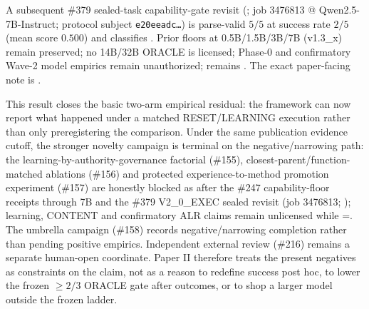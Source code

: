\begin{sloppypar}
A subsequent \#379 sealed-task capability-gate revisit (; job 3476813 @ Qwen2.5-7B-Instruct; protocol subject \texttt{e20eeadc\ldots}) is parse-valid $5/5$ at success rate $2/5$ (mean score $0.500$) and classifies .  Prior floors at 0.5B/1.5B/3B/7B (v1.3\_x) remain preserved; no 14B/32B ORACLE is licensed; Phase-0 and confirmatory Wave-2 model empirics remain unauthorized;  remains .  The exact paper-facing note is
.
\end{sloppypar}


This result closes the basic two-arm empirical residual: the framework can now report what happened under a matched RESET/LEARNING execution rather than only preregistering the comparison.  Under the same publication evidence cutoff, the stronger novelty campaign is terminal on the negative/narrowing path: the learning-by-authority-governance factorial (\#155), closest-parent/function-matched ablations (\#156) and protected experience-to-method promotion experiment (\#157) are honestly blocked as  after the \#247 capability-floor receipts through 7B and the \#379 V2\_0\_EXEC sealed revisit (job 3476813; ); learning, CONTENT and confirmatory ALR claims remain unlicensed while =.  The umbrella campaign (\#158) records negative/narrowing completion rather than pending positive empirics.  Independent external review (\#216) remains a separate human-open coordinate.  Paper II therefore treats the present negatives as constraints on the claim, not as a reason to redefine success post hoc, to lower the frozen $\ge 2/3$ ORACLE gate after outcomes, or to shop a larger model outside the frozen ladder.

